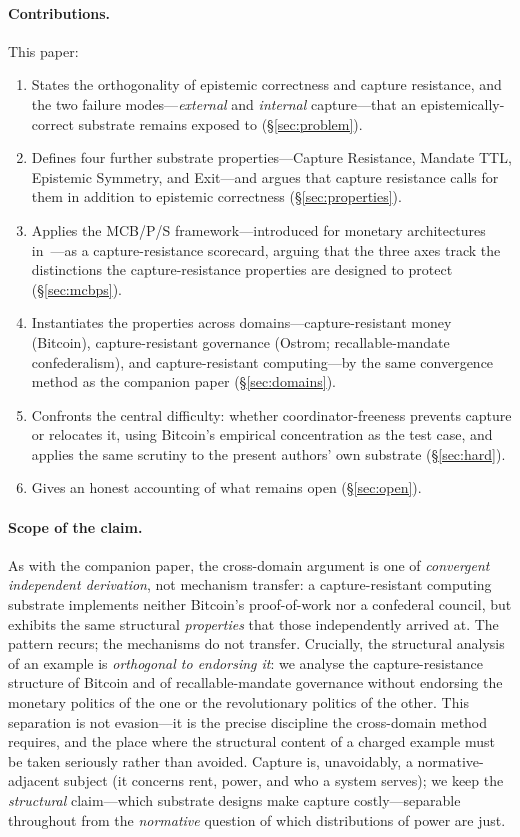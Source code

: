 \documentclass[11pt]{article}
\theoremstyle{definition}
\theoremstyle{plain}
\begin{document}
\paragraph{Contributions.} This paper:
\begin{enumerate}
\item States the orthogonality of epistemic correctness and capture resistance,
  and the two failure modes---\emph{external} and \emph{internal} capture---that
  an epistemically-correct substrate remains exposed to (\S\ref{sec:problem}).
\item Defines four further substrate properties---Capture Resistance, Mandate TTL,
  Epistemic Symmetry, and Exit---and argues that capture resistance calls for them in
  addition to epistemic correctness (\S\ref{sec:properties}).
\item Applies the MCB/P/S framework---introduced for monetary architectures
  in~\cite{nicholson2025}---as a capture-resistance scorecard, arguing that the three
  axes track the distinctions the capture-resistance properties are designed to
  protect (\S\ref{sec:mcbps}).
\item Instantiates the properties across domains---capture-resistant money
  (Bitcoin), capture-resistant governance (Ostrom; recallable-mandate
  confederalism), and capture-resistant computing---by the same convergence method
  as the companion paper (\S\ref{sec:domains}).
\item Confronts the central difficulty: whether coordinator-freeness prevents
  capture or relocates it, using Bitcoin's empirical concentration as the test
  case, and applies the same scrutiny to the present authors' own substrate
  (\S\ref{sec:hard}).
\item Gives an honest accounting of what remains open (\S\ref{sec:open}).
\end{enumerate}

\paragraph{Scope of the claim.} As with the companion paper, the cross-domain
argument is one of \emph{convergent independent derivation}, not mechanism
transfer: a capture-resistant computing substrate implements neither Bitcoin's
proof-of-work nor a confederal council, but exhibits the same structural
\emph{properties} that those independently arrived at. The pattern recurs; the
mechanisms do not transfer. Crucially, the structural analysis of an example is
\emph{orthogonal to endorsing it}: we analyse the capture-resistance structure of
Bitcoin and of recallable-mandate governance without endorsing the monetary
politics of the one or the revolutionary politics of the other. This separation is
not evasion---it is the precise discipline the cross-domain method requires, and
the place where the structural content of a charged example must be taken
seriously rather than avoided. Capture is, unavoidably, a normative-adjacent
subject (it concerns rent, power, and who a system serves); we keep the
\emph{structural} claim---which substrate designs make capture costly---separable
throughout from the \emph{normative} question of which distributions of power are
just.
\end{document}
